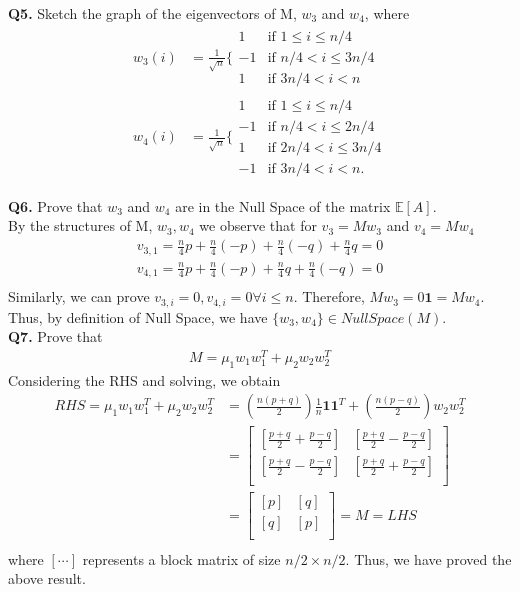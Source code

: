 \documentclass[9pt]{article}
\def\E{\mathbb{E}} %
\def\i{\mathbf{1}} %
\begin{document}
\textbf{Q5.} Sketch the graph of the eigenvectors of M, $w_3$ and $w_4$, where
\begin{align}
w_3(i) &= \frac{1}{\sqrt{n}} \Bigg\lbrace \begin{array}{cc}
1 & \text{if } 1 \leq i \leq n/4 \\
-1 & \text{if } n/4 < i \leq 3n/4 \\
1 & \text{if } 3n/4 < i < n 
\end{array}\\
w_4(i) &= \frac{1}{\sqrt{n}} \Bigg\lbrace \begin{array}{cc}
1 & \text{if }1 \leq i \leq n/4 \\
-1 & \text{if }n/4 < i \leq 2n/4 \\
1 & \text{if }2n/4 < i \leq 3n/4 \\
-1 & \text{if }3n/4 < i < n .
\end{array}
\end{align}


\textbf{Q6. }Prove that $w_3$ and $w_4$ are in the Null Space of the matrix $\E{[A]}$.\\
By the structures of M, $w_3, w_4$ we observe that for $v_3 = Mw_3$ and $v_4 = Mw_4$
\begin{align*}
v_{3,1} = \frac{n}{4} p + \frac{n}{4} (-p) + \frac{n}{4} (-q) + \frac{n}{4} q = 0\\
v_{4,1} = \frac{n}{4} p + \frac{n}{4} (-p) + \frac{n}{4} q + \frac{n}{4} (-q) = 0\\
\end{align*}
Similarly, we can prove $v_{3,i} = 0 , v_{4,i} = 0 \forall i \leq n$.
Therefore, $Mw_3 = 0\i = Mw_4$. Thus, by definition of Null Space, we have $\{w_3,w_4\} \in NullSpace(M)$.\\

\textbf{Q7. } Prove that \begin{align}
M = \mu_1 w_1 w_1^T + \mu_2 w_2 w_2^T
\end{align}
Considering the RHS and solving, we obtain
\begin{align*}
RHS = \mu_1 w_1 w_1^T + \mu_2 w_2 w_2^T &= (\frac{n(p+q)}{2})  \frac{1}{n} \i \i^T  + (\frac{n(p-q)}{2})  w_2 w_2^T\\
&= \begin{bmatrix}
[\frac{p+q}{2} + \frac{p-q}{2}] & [\frac{p+q}{2} - \frac{p-q}{2}]\\
[\frac{p+q}{2} - \frac{p-q}{2}] & [\frac{p+q}{2} + \frac{p-q}{2}]\\
\end{bmatrix} \\
&= \begin{bmatrix}
[p] & [q]\\
[q] & [p]\\
\end{bmatrix}  = M = LHS\\
\end{align*}
where $[\cdots]$ represents a block matrix of size $n/2 \times n/2$. Thus, we have proved the above result.\\
\end{document}
